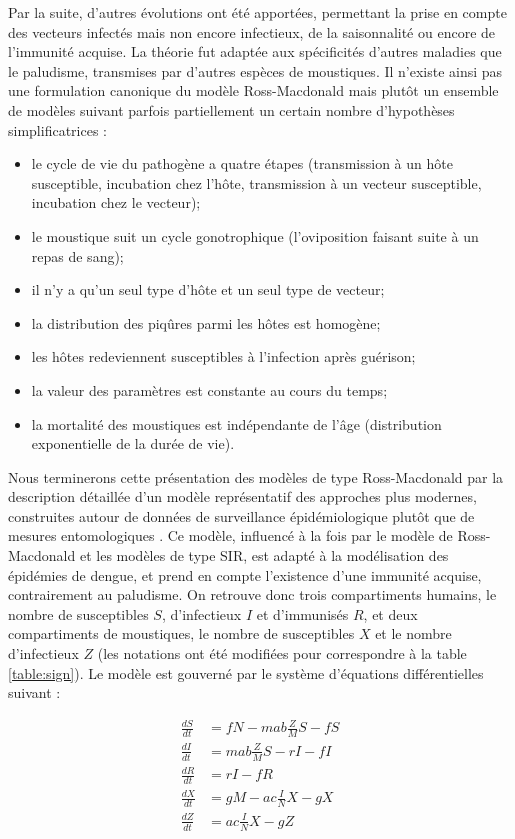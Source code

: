 Par la suite, d'autres évolutions ont été apportées, permettant la prise en compte des vecteurs infectés mais non encore infectieux, de la saisonnalité ou encore de l'immunité acquise. 
La théorie fut adaptée aux spécificités d'autres maladies que le paludisme, transmises par d'autres espèces de moustiques.
Il n'existe ainsi pas une formulation canonique du modèle Ross-Macdonald mais plutôt un ensemble de modèles suivant parfois partiellement un certain nombre d'hypothèses simplificatrices \cite{smith2012ross} : 
\begin{itemize}
\item le cycle de vie du pathogène a quatre étapes (transmission à un hôte susceptible, incubation chez l'hôte, transmission à un vecteur susceptible, incubation chez le vecteur);
\item le moustique suit un cycle gonotrophique (l'oviposition faisant suite à un repas de sang);
\item il n'y a qu'un seul type d'hôte et un seul type de vecteur;
\item la distribution des piqûres parmi les hôtes est homogène;
\item les hôtes redeviennent susceptibles à l'infection après guérison;
\item la valeur des paramètres est constante au cours du temps;
\item la mortalité des moustiques est indépendante de l'âge (distribution exponentielle de la durée de vie).
\end{itemize}

Nous terminerons cette présentation des modèles de type Ross-Macdonald par la description détaillée d'un modèle  représentatif des approches plus modernes, construites autour de données de surveillance épidémiologique plutôt que de mesures entomologiques \cite{pandey2013comparing}. 
Ce modèle, influencé à la fois par le modèle de Ross-Macdonald et les modèles de type SIR, est adapté à la modélisation des épidémies de dengue, et prend en compte l'existence d'une immunité acquise, contrairement au paludisme.
On retrouve donc trois compartiments humains, le nombre de susceptibles $S$, d'infectieux $I$ et d'immunisés $R$, et deux compartiments de moustiques, le nombre de susceptibles $X$ et le nombre d'infectieux $Z$ (les notations ont été modifiées pour correspondre à la table \ref{table:sign}). 
Le modèle est gouverné par le système d'équations différentielles suivant :

\begin{align}
\frac{dS}{dt} &= fN - mab\frac{Z}{M}S - fS \\ \nonumber
\frac{dI}{dt} &= mab\frac{Z}{M}S - rI - fI \\ \nonumber
\frac{dR}{dt} &= rI - fR \\  \nonumber
\frac{dX}{dt} &= gM - ac\frac{I}{N}X - gX \\ \nonumber
\frac{dZ}{dt} &= ac\frac{I}{N}X - gZ
\end{align}

